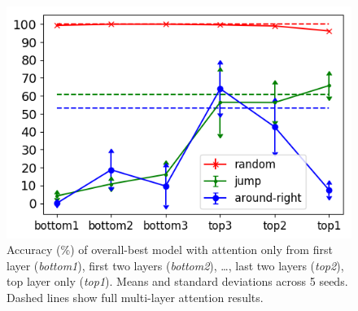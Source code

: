 \begin{figure}[tb]
    \centering
    \includegraphics[width=.5\textwidth,keepaspectratio]{figures/attention_exp.png}
    \caption{Accuracy (\%) of overall-best model with attention
      only from first layer (\emph{bottom1}), first two layers
      (\emph{bottom2}), \ldots, last two layers (\emph{top2}), top
      layer only (\emph{top1}). Means and standard deviations across 5
      seeds. Dashed lines show full multi-layer attention results.}
    \label{fig:exp3}
\end{figure}

